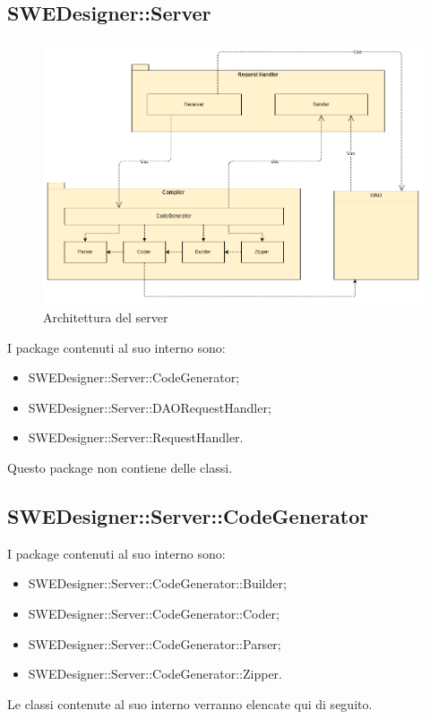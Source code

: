 \documentclass[../DefinizioneDiProdotto.tex]{subfiles}
\begin{document}
			\subsection{SWEDesigner::Server}
				\begin{figure}[H]\label{fig:ServerSubsystem}
					\centering
					\includegraphics[scale=0.4]{Immagini/DiagrammaArchitettura/ServerSubsystem.png}
					\caption{Architettura del server}
				\end{figure}
				I package contenuti al suo interno sono:
				\begin{itemize}
					\item SWEDesigner::Server::CodeGenerator;
					\item SWEDesigner::Server::DAORequestHandler;
					\item SWEDesigner::Server::RequestHandler.
				\end{itemize}
				Questo package non contiene delle classi.

			\subsection{SWEDesigner::Server::CodeGenerator}
				I package contenuti al suo interno sono:
				\begin{itemize}
					\item SWEDesigner::Server::CodeGenerator::Builder;
					\item SWEDesigner::Server::CodeGenerator::Coder;
					\item SWEDesigner::Server::CodeGenerator::Parser;
					\item SWEDesigner::Server::CodeGenerator::Zipper.
				\end{itemize}
				Le classi contenute al suo interno verranno elencate qui di seguito.
\end{document}
